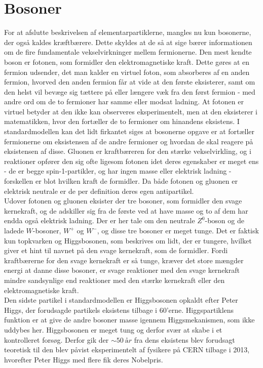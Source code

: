 \section{Bosoner}
For at afslutte beskrivelsen af elementarpartiklerne, mangles nu kun bosonerne, der også kaldes kræftbærere. Dette skyldes at de så at sige bærer informationen om de fire fundamentale vekselvirkninger mellem fermionerne. Den mest kendte boson er fotonen, som formidler den elektromagnetiske kraft. Dette gøres at en fermion udsender, det man kalder en virtuel foton, som absorberes af en anden fermion, hvorved den anden fermion får at vide at den første eksisterer, samt om den helst vil bevæge sig tættere på eller længere væk fra den først fermion - med andre ord om de to fermioner har samme eller modsat ladning. At fotonen er virtuel betyder at den ikke kan observeres eksperimentelt, men at den eksisterer i matematikken, hvor den fortæller de to fermioner om hinandens eksistens. I standardmodellen kan det lidt firkantet siges at bosonerne opgave er at fortæller fermionerne om eksistensen af de andre fermioner og hvordan de skal reagere på eksistensen af disse. Gluonen er kraftbæreren for den stærke vekselvirkling, og i reaktioner opfører den sig ofte ligesom fotonen idet deres egenskaber er meget ens - de er begge spin-1-partikler, og har ingen masse eller elektrisk ladning - forskellen er blot hvilken kraft de formidler. Da både fotonen og gluonen er elektrisk neutrale er de per definition deres egen antipartikel. \\

Udover fotonen og gluonen eksister der tre bosoner, som formidler den svage kernekraft, og de adskiller sig fra de første ved at have masse og to af dem har endda også elektrisk ladning. Der er her tale om den neutrale $Z^0$-boson og de ladede $W$-bosoner, $W^+$ og $W^-$, og disse tre bosoner er meget tunge. Det er faktisk kun topkvarken og Higgsbosonen, som beskrives om lidt, der er tungere, hvilket giver et hint til navnet på den svage kernekraft, som de formidler. Fordi kraftbærerne for den svage kernekraft er så tunge, kræver det store mængder energi at danne disse bosoner, er svage reaktioner med den svage kernekraft mindre sandsynlige end reaktioner med den stærke kernekraft eller den elektromagnetiske kraft. \\

Den sidste partikel i standardmodellen er Higgsbosonen opkaldt efter Peter Higgs, der forudsagde partikels eksistens tilbage i 60'erne. Higgspartiklens funktion er at give de andre bosoner masse igennem Higgsmekanismen, som ikke uddybes her. Higgsbosonen er meget tung og derfor svær at skabe i et kontrolleret forsøg. Derfor gik der $\sim\SI{50}{år}$ fra dens eksistens blev forudsagt teoretisk til den blev påvist eksperimentelt af fysikere på CERN tilbage i 2013, hvorefter Peter Higgs med flere fik deres Nobelpris.

